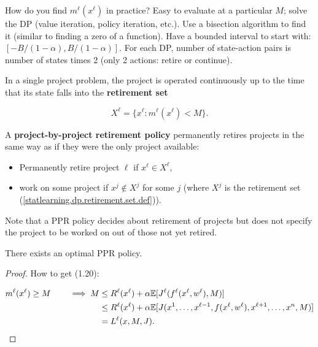 How do you find \(m^\ell(x^\ell)\) in practice? Easy to evaluate at a particular \(M\); solve the DP (value iteration, policy iteration, etc.). Use a bisection algorithm to find it (similar to finding a zero of a function). Have a bounded interval to start with: \([-B/(1-\alpha), B/(1- \alpha)]\). For each DP, number of state-action pairs is number of states times 2 (only 2 actions: retire or continue). 



\begin{definition}

In a single project problem, the project is operated continuously up to the time that its state falls into the \textbf{retirement set}

\begin{equation}\label{statlearning.dp.retirement.set.def}
X^\ell = \{x^\ell : m^\ell(x^\ell) < M \}.
\end{equation}

A \textbf{project-by-project retirement policy} permanently retires projects in the same way as if they were the only project available:

\begin{itemize}

\item Permanently retire project \(\ell\) if \(x^\ell \in X^\ell\),

\item work on some project if \(x^j \notin X^j \) for some \(j\) (where \(X^j\) is the retirement set (\ref{statlearning.dp.retirement.set.def})). 

\end{itemize}

\end{definition}

Note that a PPR policy decides about retirement of projects but does not specify the project to be worked on out of those not yet retired.

\begin{proposition}\label{statlearning.dp.prop.1.3.2.v2}

There exists an optimal PPR policy.

\end{proposition}

\begin{proof}

How to get (1.20):

\begin{align*}
m^\ell(x^\ell ) \geq M \qquad \implies  M & \leq R^\ell(x^\ell) + \alpha \mathbb{E}[J^\ell(f^\ell(x^\ell, w^\ell), M)] 
\\ & \leq R^\ell(x^\ell) + \alpha \mathbb{E}[J(x^1, \ldots, x^{\ell-1}, f(x^\ell, w^\ell), x^{\ell + 1}, \ldots, x^n, M)]
\\ & = L^\ell(x, M, J).
\end{align*}



\end{proof}

